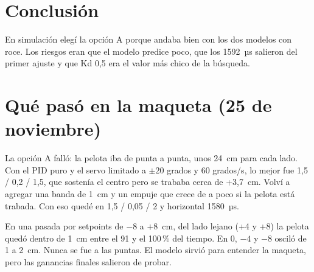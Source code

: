 \documentclass[11pt,a4paper]{article}
\begin{document}
\section{Conclusión}
En simulación elegí la opción A porque andaba bien con los dos modelos con roce. Los riesgos eran que el modelo predice poco, que los 1592~µs salieron del primer ajuste y que Kd 0,5 era el valor más chico de la búsqueda.

\section{Qué pasó en la maqueta (25 de noviembre)}
La opción A falló: la pelota iba de punta a punta, unos 24~cm para cada lado. Con el PID puro y el servo limitado a $\pm 20$ grados y 60 grados/s, lo mejor fue 1,5 / 0,2 / 1,5, que sostenía el centro pero se trababa cerca de +3,7~cm. Volví a agregar una banda de 1~cm y un empuje que crece de a poco si la pelota está trabada. Con eso quedé en 1,5 / 0,05 / 2 y horizontal 1580~µs.

En una pasada por setpoints de $-8$ a $+8$~cm, del lado lejano (+4 y +8) la pelota quedó dentro de 1~cm entre el 91 y el 100\,\% del tiempo. En 0, $-4$ y $-8$ osciló de 1 a 2~cm. Nunca se fue a las puntas. El modelo sirvió para entender la maqueta, pero las ganancias finales salieron de probar.
\end{document}
